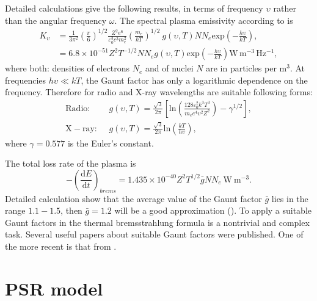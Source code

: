 \documentclass[oneside,a4paper,11pt]{report}
\begin{document}
Detailed calculations give the following results, in terms of frequency $\upsilon$ rather than the angular
frequency $\omega$. The spectral plasma emissivity according to \citet{longair:1} is
\begin{equation}
 \label{tbremss1}
\begin{split}
 K_\upsilon &= \frac{1}{3\pi^2}\left ( \frac{\pi}{6} \right )^{1/2} \frac{Z^2e^6}{\varepsilon^3_0c^3m_e^2} \left ( \frac{m_e}{kT} \right )^{1/2} \: g(\upsilon,T) N N_e \mathrm{exp}\left ( -\frac{h \upsilon}{kT} \right ), \\
 & = 6.8 \times 10^{-51} Z^2 T^{-1/2} N N_e g(\upsilon, T) \mathrm{exp}\left ( - \frac{h \upsilon}{kT} \right ) \mathrm{W\,m^{-3}\,Hz^{-1}},     
\end{split}
\end{equation}
where both: densities of electrons $N_e$ and of nuclei $N$ are in particles per $\mathrm{m^3}$. At frequencies 
$h \upsilon \ll kT$, the Gaunt factor has only a logarithmic dependence on the frequency.  
Therefore for radio and X-ray wavelengths are suitable following forms:
\begin{equation}
 \label{approx_brem}
\begin{split}
 \mathrm{Radio:} & \: \:g(\upsilon, T) = \frac{\sqrt{3}}{2\pi}\left [ \mathrm{ln} \left ( \frac{128\varepsilon_0^2k^3T^3}{m_e e^4 \upsilon^2 Z^2} \right ) - \gamma^{1/2} \right ] ,\\
 \mathrm{X-ray:} & \: \:g(\upsilon, T) = \frac{\sqrt{3}}{2\pi} \mathrm{ln} \left ( \frac{kT}{h\upsilon} \right ),
\end{split}
\end{equation}
where $\gamma = 0.577$ is the Euler's constant. 

The total loss rate of the plasma is
\begin{equation}
 \label{thermbrems_f}
-\left ( \frac{\mathrm{d}E}{\mathrm{d}t} \right )_{brems} = 1.435 \times10^{-40}Z^2T^{1/2}\bar{g}N N_e \: \mathrm{W\:m^{-3}}.
\end{equation}
Detailed calculation show that the average value of the Gaunt factor $\bar{g}$ lies in the range 
$1.1 - 1.5$, then $\bar{g} = 1.2$ will be a good approximation (\citet{longair:1}).  
To apply a suitable Gaunt factors in the thermal bremsstrahlung formula is a nontrivial and complex task.
Several useful papers about suitable Gaunt factors were published. One of the more recent is that from 
\citet{1998MNRAS.300..321S}.

\section{PSR model}
\end{document}
